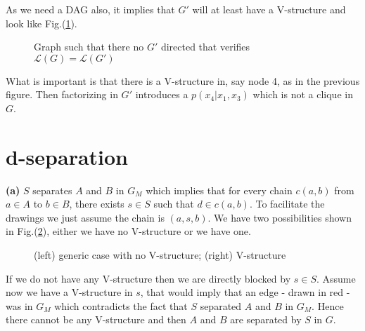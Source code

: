\documentclass[10pt]{article}
\begin{document}
\begin{itemize}
As we need a DAG also, it implies that $G'$ will at least have a V-structure and look like Fig.(\ref{fig5}).
\begin{figure}[h!]
\centering
{}
\caption{Graph such that there no $G'$ directed that verifies $\mathcal{L}(G) = \mathcal{L}(G')$}
\label{fig5}
\end{figure}

What is important is that there is a V-structure in, say node 4, as in the previous figure. Then factorizing in $G'$ introduces a $p(x_4| x_1,x_3)$ which is not a clique in $G$.

\end{itemize}



\section{d-separation}

\textbf{(a) }$S$ separates $A$ and $B$ in $G_M$ which implies that for every chain $c(a,b)$ from $a\in A$ to $b\in B$, there exists $s\in S$ such that $d\in c(a,b)$. To facilitate the drawings we just assume the chain is $(a,s,b)$. We have two possibilities shown in Fig.(\ref{fig6}), either we have no V-structure or we have one.
\begin{figure}[h!]
\centering
{}
\caption{(left) generic case with no V-structure; (right) V-structure}
\label{fig6}
\end{figure}

If we do not have any V-structure then we are directly blocked by $s\in S$. Assume now we have a V-structure in $s$, that would imply that an edge - drawn in red - was in $G_M$ which contradicts the fact that $S$ separated $A$ and $B$ in $G_M$. Hence there cannot be any V-structure and then $A$ and $B$ are separated by $S$ in $G$.\\
\end{document}
